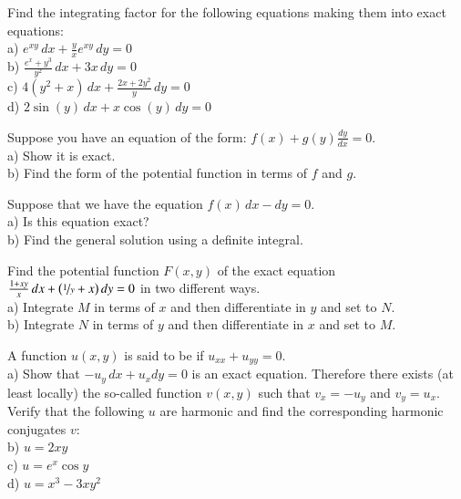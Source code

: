 \documentclass[12pt]{book}
\begin{document}
\begin{exercise}
Find the integrating factor for the following equations making them into
exact equations:\\
a)
$e^{xy} \, dx + \frac{y}{x} e^{xy} \, dy = 0$
\\
b)
$\frac{e^x+y^3}{y^2} \, dx + 3x \, dy = 0$
\\
c)
$4(y^2+x) \, dx + \frac{2x+2y^2}{y} \, dy = 0$
\\
d)
$2\sin(y) \, dx + x\cos(y)\, dy = 0$
\end{exercise}

\begin{exercise}
Suppose you have an equation of the form:
$f(x) + g(y) \frac{dy}{dx} = 0$. \\
a) Show it is exact.\\
b) Find the form of the potential function in terms of $f$ and $g$.
\end{exercise}

\begin{exercise}
Suppose that we have the equation $f(x) \, dx - dy = 0$.\\
a) Is this equation exact?\\
b) Find the general solution using a definite integral.
\end{exercise}

\begin{exercise}
Find the potential function $F(x,y)$ of the exact equation $\frac{1+xy}{x}\, dx +
\bigl(\nicefrac{1}{y} + x \bigr) \, dy = 0$ in two different ways.\\
a) Integrate $M$ in terms of $x$ and then differentiate in $y$ and set to
$N$.\\
b) Integrate $N$ in terms of $y$ and then differentiate in $x$ and set to
$M$.
\end{exercise}

\begin{samepage}
\begin{exercise}
A function $u(x,y)$ is said to be \emph{} if
$u_{xx} + u_{yy} = 0$.
\\
a) Show that $-u_y \, dx + u_x dy = 0$ is an exact equation.  Therefore
there exists (at least locally)
the so-called \emph{} function
$v(x,y)$ such that $v_x = -u_y$ and $v_y = u_x$.
\\
Verify that the following $u$ are harmonic and 
find the corresponding harmonic conjugates $v$:
\\
b) $u = 2xy$
\\
c) $u = e^x \cos y$
\\
d) $u = x^3-3xy^2$
\end{exercise}
\end{samepage}
\end{document}
